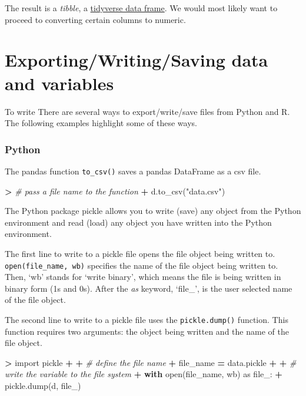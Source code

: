 \documentclass[
]{book}
\newenvironment{Shaded}{\begin{snugshade}}{\end{snugshade}}
\newcommand{\BuiltInTok}[1]{#1}
\newcommand{\CommentTok}[1]{\textcolor[rgb]{0.56,0.35,0.01}{\textit{#1}}}
\newcommand{\ControlFlowTok}[1]{\textcolor[rgb]{0.13,0.29,0.53}{\textbf{#1}}}
\newcommand{\ImportTok}[1]{#1}
\newcommand{\NormalTok}[1]{#1}
\newcommand{\OperatorTok}[1]{\textcolor[rgb]{0.81,0.36,0.00}{\textbf{#1}}}
\newcommand{\StringTok}[1]{\textcolor[rgb]{0.31,0.60,0.02}{#1}}
\begin{document}
The result is a \emph{tibble}, a \href{https://tibble.tidyverse.org/}{tidyverse data frame}. We would most likely want to proceed to converting certain columns to numeric.

\hypertarget{exportingwritingsaving-data-and-variables}{%
\section{Exporting/Writing/Saving data and variables}\label{exportingwritingsaving-data-and-variables}}

To write
There are several ways to export/write/save files from Python and R. The following examples highlight some of these ways.

\hypertarget{python-16}{%
\subsubsection*{Python}\label{python-16}}

The pandas function \texttt{to\_csv()} saves a pandas DataFrame as a csv file.

\begin{Shaded}
\begin{Highlighting}[]
\OperatorTok{\textgreater{}} \CommentTok{\# pass a file name to the function}
\OperatorTok{+}\NormalTok{ d.to\_csv(}\StringTok{"data.csv"}\NormalTok{)}
\end{Highlighting}
\end{Shaded}

The Python package pickle allows you to write (save) any object from the Python environment and read (load) any object you have written into the Python environment.

The first line to write to a pickle file opens the file object being written to. \texttt{open(file\_name,\ \textquotesingle{}wb\textquotesingle{})} specifies the name of the file object being written to. Then, `wb' stands for `write binary', which means the file is being written in binary form (1s and 0s). After the \emph{as} keyword, `file\_', is the user selected name of the file object.

The second line to write to a pickle file uses the \texttt{pickle.dump()} function. This function requires two arguments: the object being written and the name of the file object.

\begin{Shaded}
\begin{Highlighting}[]
\OperatorTok{\textgreater{}} \ImportTok{import}\NormalTok{ pickle}
\OperatorTok{+} 
\OperatorTok{+} \CommentTok{\# define the file name}
\OperatorTok{+}\NormalTok{ file\_name }\OperatorTok{=} \StringTok{\textquotesingle{}data.pickle\textquotesingle{}}
\OperatorTok{+} 
\OperatorTok{+} \CommentTok{\# write the variable to the file system}
\OperatorTok{+} \ControlFlowTok{with} \BuiltInTok{open}\NormalTok{(file\_name, }\StringTok{\textquotesingle{}wb\textquotesingle{}}\NormalTok{) }\ImportTok{as}\NormalTok{ file\_:}
\OperatorTok{+}\NormalTok{     pickle.dump(d, file\_)}
\end{Highlighting}
\end{Shaded}
\end{document}
